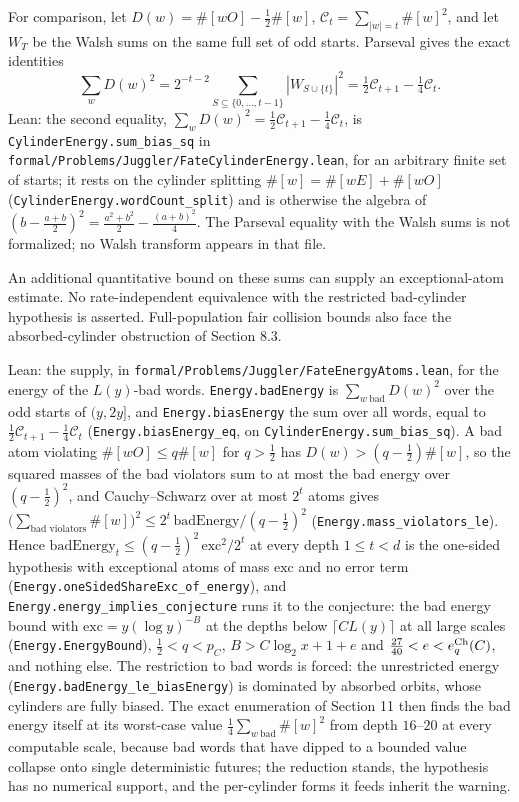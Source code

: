 \documentclass[11pt,a4paper]{article}
\begin{document}
For comparison, let \(D(w)=\#[wO]-\tfrac12\#[w]\),
\(\mathcal C_t=\sum_{|w|=t}\#[w]^2\), and let \(W_T\) be the Walsh sums
on the same full set of odd starts. Parseval gives the exact identities
\[
\sum_w D(w)^2=2^{-t-2}\sum_{S\subseteq\{0,\ldots,t-1\}}
 |W_{S\cup\{t\}}|^2
 =\tfrac12\mathcal C_{t+1}-\tfrac14\mathcal C_t.
\] Lean: the second equality,
\(\sum_wD(w)^2=\tfrac12\mathcal C_{t+1}-\tfrac14\mathcal C_t\), is
\texttt{\nolinkurl{CylinderEnergy.sum_bias_sq}} in
\texttt{\nolinkurl{formal/Problems/Juggler/FateCylinderEnergy.lean}},
for an arbitrary finite set of starts; it rests on the cylinder
splitting \(\#[w]=\#[wE]+\#[wO]\)
(\texttt{\nolinkurl{CylinderEnergy.wordCount_split}}) and is otherwise
the algebra of \((b-\tfrac{a+b}2)^2=\tfrac{a^2+b^2}2-\tfrac{(a+b)^2}4\).
The Parseval equality with the Walsh sums is not formalized; no Walsh
transform appears in that file.

An additional quantitative bound on these sums can supply an
exceptional-atom estimate. No rate-independent equivalence with the
restricted bad-cylinder hypothesis is asserted. Full-population fair
collision bounds also face the absorbed-cylinder obstruction of Section
8.3.

Lean: the supply, in
\texttt{\nolinkurl{formal/Problems/Juggler/FateEnergyAtoms.lean}}, for
the energy of the \(L(y)\)-bad words.
\texttt{\nolinkurl{Energy.badEnergy}} is \(\sum_{w\ \text{bad}}D(w)^2\)
over the odd starts of \((y,2y]\), and
\texttt{\nolinkurl{Energy.biasEnergy}} the sum over all words, equal to
\(\tfrac12\mathcal C_{t+1}-\tfrac14\mathcal C_t\)
(\texttt{\nolinkurl{Energy.biasEnergy_eq}}, on
\texttt{\nolinkurl{CylinderEnergy.sum_bias_sq}}). A bad atom violating
\(\#[wO]\le q\#[w]\) for \(q>\tfrac12\) has \(D(w)>(q-\tfrac12)\#[w]\),
so the squared masses of the bad violators sum to at most the bad energy
over \((q-\tfrac12)^2\), and Cauchy--Schwarz over at most \(2^t\) atoms
gives
\(\bigl(\sum_{\text{bad violators}}\#[w]\bigr)^2\le2^t\,\mathrm{badEnergy}/(q-\tfrac12)^2\)
(\texttt{\nolinkurl{Energy.mass_violators_le}}). Hence
\(\mathrm{badEnergy}_t\le(q-\tfrac12)^2\,\mathrm{exc}^2/2^t\) at every
depth \(1\le t<d\) is the one-sided hypothesis with exceptional atoms of
mass \(\mathrm{exc}\) and no error term
(\texttt{\nolinkurl{Energy.oneSidedShareExc_of_energy}}), and
\texttt{\nolinkurl{Energy.energy_implies_conjecture}} runs it to the
conjecture: the bad energy bound with \(\mathrm{exc}=y(\log y)^{-B}\) at
the depths below \(\lceil CL(y)\rceil\) at all large scales
(\texttt{\nolinkurl{Energy.EnergyBound}}), \(\tfrac12<q<p_C\),
\(B>C\log_2x+1+e\) and \(\tfrac{27}{40}<e<e^{\rm Ch}_q(C)\), and nothing
else. The restriction to bad words is forced: the unrestricted energy
(\texttt{\nolinkurl{Energy.badEnergy_le_biasEnergy}}) is dominated by
absorbed orbits, whose cylinders are fully biased. The exact enumeration
of Section 11 then finds the bad energy itself at its worst-case value
\(\tfrac14\sum_{w\ \text{bad}}\#[w]^2\) from depth \(16\)--\(20\) at
every computable scale, because bad words that have dipped to a bounded
value collapse onto single deterministic futures; the reduction stands,
the hypothesis has no numerical support, and the per-cylinder forms it
feeds inherit the warning.
\end{document}
